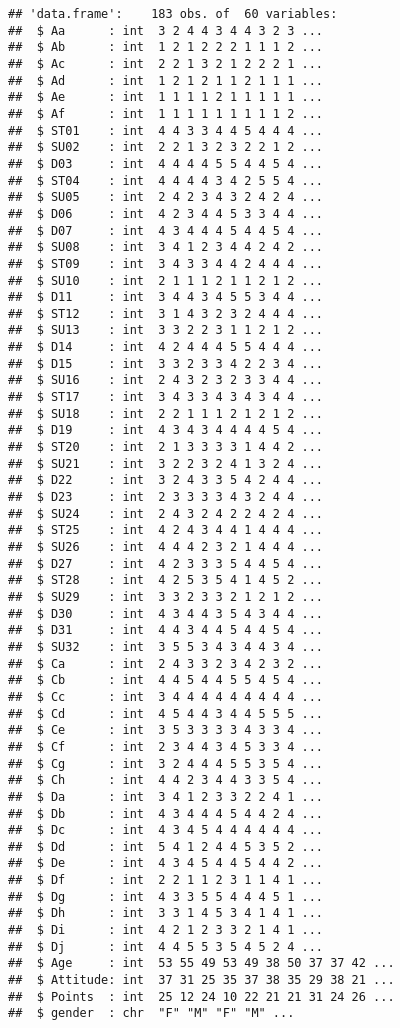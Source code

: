 \documentclass[
]{article}
\begin{document}
\begin{verbatim}
## 'data.frame':    183 obs. of  60 variables:
##  $ Aa      : int  3 2 4 4 3 4 4 3 2 3 ...
##  $ Ab      : int  1 2 1 2 2 2 1 1 1 2 ...
##  $ Ac      : int  2 2 1 3 2 1 2 2 2 1 ...
##  $ Ad      : int  1 2 1 2 1 1 2 1 1 1 ...
##  $ Ae      : int  1 1 1 1 2 1 1 1 1 1 ...
##  $ Af      : int  1 1 1 1 1 1 1 1 1 2 ...
##  $ ST01    : int  4 4 3 3 4 4 5 4 4 4 ...
##  $ SU02    : int  2 2 1 3 2 3 2 2 1 2 ...
##  $ D03     : int  4 4 4 4 5 5 4 4 5 4 ...
##  $ ST04    : int  4 4 4 4 3 4 2 5 5 4 ...
##  $ SU05    : int  2 4 2 3 4 3 2 4 2 4 ...
##  $ D06     : int  4 2 3 4 4 5 3 3 4 4 ...
##  $ D07     : int  4 3 4 4 4 5 4 4 5 4 ...
##  $ SU08    : int  3 4 1 2 3 4 4 2 4 2 ...
##  $ ST09    : int  3 4 3 3 4 4 2 4 4 4 ...
##  $ SU10    : int  2 1 1 1 2 1 1 2 1 2 ...
##  $ D11     : int  3 4 4 3 4 5 5 3 4 4 ...
##  $ ST12    : int  3 1 4 3 2 3 2 4 4 4 ...
##  $ SU13    : int  3 3 2 2 3 1 1 2 1 2 ...
##  $ D14     : int  4 2 4 4 4 5 5 4 4 4 ...
##  $ D15     : int  3 3 2 3 3 4 2 2 3 4 ...
##  $ SU16    : int  2 4 3 2 3 2 3 3 4 4 ...
##  $ ST17    : int  3 4 3 3 4 3 4 3 4 4 ...
##  $ SU18    : int  2 2 1 1 1 2 1 2 1 2 ...
##  $ D19     : int  4 3 4 3 4 4 4 4 5 4 ...
##  $ ST20    : int  2 1 3 3 3 3 1 4 4 2 ...
##  $ SU21    : int  3 2 2 3 2 4 1 3 2 4 ...
##  $ D22     : int  3 2 4 3 3 5 4 2 4 4 ...
##  $ D23     : int  2 3 3 3 3 4 3 2 4 4 ...
##  $ SU24    : int  2 4 3 2 4 2 2 4 2 4 ...
##  $ ST25    : int  4 2 4 3 4 4 1 4 4 4 ...
##  $ SU26    : int  4 4 4 2 3 2 1 4 4 4 ...
##  $ D27     : int  4 2 3 3 3 5 4 4 5 4 ...
##  $ ST28    : int  4 2 5 3 5 4 1 4 5 2 ...
##  $ SU29    : int  3 3 2 3 3 2 1 2 1 2 ...
##  $ D30     : int  4 3 4 4 3 5 4 3 4 4 ...
##  $ D31     : int  4 4 3 4 4 5 4 4 5 4 ...
##  $ SU32    : int  3 5 5 3 4 3 4 4 3 4 ...
##  $ Ca      : int  2 4 3 3 2 3 4 2 3 2 ...
##  $ Cb      : int  4 4 5 4 4 5 5 4 5 4 ...
##  $ Cc      : int  3 4 4 4 4 4 4 4 4 4 ...
##  $ Cd      : int  4 5 4 4 3 4 4 5 5 5 ...
##  $ Ce      : int  3 5 3 3 3 3 4 3 3 4 ...
##  $ Cf      : int  2 3 4 4 3 4 5 3 3 4 ...
##  $ Cg      : int  3 2 4 4 4 5 5 3 5 4 ...
##  $ Ch      : int  4 4 2 3 4 4 3 3 5 4 ...
##  $ Da      : int  3 4 1 2 3 3 2 2 4 1 ...
##  $ Db      : int  4 3 4 4 4 5 4 4 2 4 ...
##  $ Dc      : int  4 3 4 5 4 4 4 4 4 4 ...
##  $ Dd      : int  5 4 1 2 4 4 5 3 5 2 ...
##  $ De      : int  4 3 4 5 4 4 5 4 4 2 ...
##  $ Df      : int  2 2 1 1 2 3 1 1 4 1 ...
##  $ Dg      : int  4 3 3 5 5 4 4 4 5 1 ...
##  $ Dh      : int  3 3 1 4 5 3 4 1 4 1 ...
##  $ Di      : int  4 2 1 2 3 3 2 1 4 1 ...
##  $ Dj      : int  4 4 5 5 3 5 4 5 2 4 ...
##  $ Age     : int  53 55 49 53 49 38 50 37 37 42 ...
##  $ Attitude: int  37 31 25 35 37 38 35 29 38 21 ...
##  $ Points  : int  25 12 24 10 22 21 21 31 24 26 ...
##  $ gender  : chr  "F" "M" "F" "M" ...
\end{verbatim}
\end{document}
